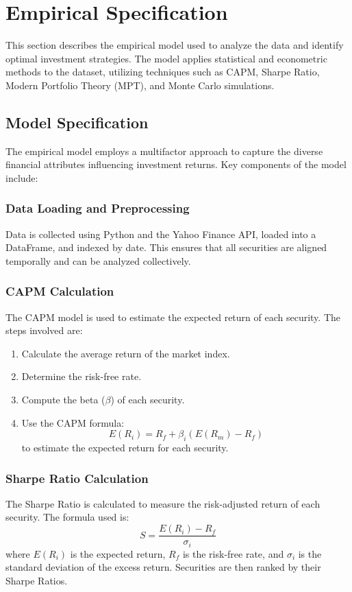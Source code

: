\section{Empirical Specification}

This section describes the empirical model used to analyze the data and identify optimal investment strategies. The model applies statistical and econometric methods to the dataset, utilizing techniques such as CAPM, Sharpe Ratio, Modern Portfolio Theory (MPT), and Monte Carlo simulations.

\subsection{Model Specification}
The empirical model employs a multifactor approach to capture the diverse financial attributes influencing investment returns. Key components of the model include:

\subsubsection{Data Loading and Preprocessing}
Data is collected using Python and the Yahoo Finance API, loaded into a DataFrame, and indexed by date. This ensures that all securities are aligned temporally and can be analyzed collectively.

\subsubsection{CAPM Calculation}
The CAPM model is used to estimate the expected return of each security. The steps involved are:
\begin{enumerate}
    \item Calculate the average return of the market index.
    \item Determine the risk-free rate.
    \item Compute the beta (\(\beta\)) of each security.
    \item Use the CAPM formula:
    \[ E(R_i) = R_f + \beta_i (E(R_m) - R_f) \]
    to estimate the expected return for each security.
\end{enumerate}

\subsubsection{Sharpe Ratio Calculation}
The Sharpe Ratio is calculated to measure the risk-adjusted return of each security. The formula used is:
\[ S = \frac{E(R_i) - R_f}{\sigma_i} \]
where \( E(R_i) \) is the expected return, \( R_f \) is the risk-free rate, and \( \sigma_i \) is the standard deviation of the excess return. Securities are then ranked by their Sharpe Ratios.

